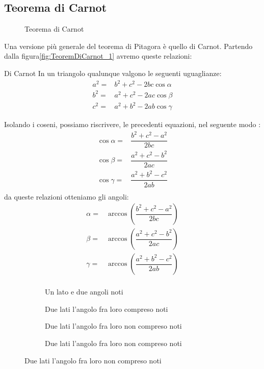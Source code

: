 \subsection{Teorema di Carnot}
\begin{figure}
	\centering
	
	\caption{Teorema di Carnot}
	\label{fig:TeoremDiCarnot_1}
\end{figure}
Una versione più generale del teorema di Pitagora è quello  di Carnot. Partendo dalla figura\nobs\vref{fig:TeoremDiCarnot_1} avremo queste relazioni:
\begin{teoremat}{Di Carnot}{}
	In un triangolo qualunque valgono le seguenti uguaglianze:
	\begin{align*}
	a^2=&b^2+c^2-2bc\cos\alpha\\
	b^2=&a^2+c^2-2ac\cos\beta\\
	c^2=&a^2+b^2-2ab\cos\gamma
	\end{align*}
\end{teoremat}

Isolando i coseni, possiamo riscrivere, le precedenti equazioni, nel  seguente modo :
\begin{align*}
\cos\alpha=&\dfrac{b^2+c^2-a^2}{2bc}\\
\cos\beta=&\dfrac{a^2+c^2-b^2}{2ac}\\
\cos\gamma=&\dfrac{a^2+b^2-c^2}{2ab}\\
\end{align*}
da queste relazioni otteniamo gli angoli:
\begin{align*}
\alpha=&\arccos(\dfrac{b^2+c^2-a^2}{2bc})\\
\beta=&\arccos(\dfrac{a^2+c^2-b^2}{2ac})\\
\gamma=&\arccos(\dfrac{a^2+b^2-c^2}{2ab})\\
\end{align*}
\begin{figure}
	\begin{subfigure}[b]{.5\linewidth}
		\centering

	\caption{Un lato e due angoli noti}
	\label{fig:risTriangQqualunque_1}
	\end{subfigure}%
	\begin{subfigure}[b]{.5\linewidth}
		\centering
	
		\caption{Due lati l'angolo fra loro compreso noti}
		\label{fig:risTriangQqualunque_2}
	\end{subfigure}
	\begin{subfigure}[b]{.5\linewidth}
		\centering
		
		\caption{Due lati l'angolo fra loro non compreso noti}
		\label{fig:risTriangQqualunque_3}
	\end{subfigure}%
	\begin{subfigure}[b]{.5\linewidth}
		\centering
		
		\caption{Due lati l'angolo fra loro non compreso noti}
		\label{fig:risTriangQqualunque_4}
	\end{subfigure}
	\label{fig:RisoluzioneTriangoliQualunque}
\end{figure}
